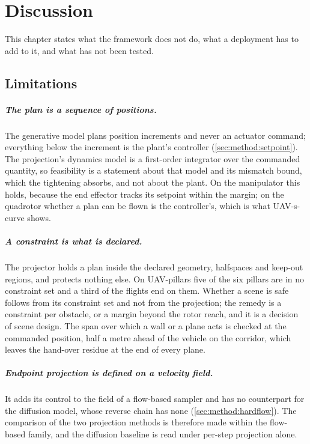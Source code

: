 \chapter{Discussion}\label{ch:discussion}

This chapter states what the framework does not do, what a deployment has to add to it, and what has
not been tested.

\section{Limitations}\label{sec:disc:limitations}

\paragraph{The plan is a sequence of positions.} The generative model plans position increments and
never an actuator command; everything below the increment is the plant's controller
(\autoref{sec:method:setpoint}). The projection's dynamics model is a first-order integrator over the
commanded quantity, so feasibility is a statement about that model and its mismatch bound, which the
tightening absorbs, and not about the plant. On the manipulator this holds, because the end effector
tracks its setpoint within the margin; on the quadrotor whether a plan can be flown is the
controller's, which is what UAV-s-curve shows.

\paragraph{A constraint is what is declared.} The projector holds a plan inside the declared geometry,
halfspaces and keep-out regions, and protects nothing else. On UAV-pillars five of the six pillars are
in no constraint set and a third of the flights end on them. Whether a scene is safe follows from its
constraint set and not from the projection; the remedy is a constraint per obstacle, or a margin beyond
the rotor reach, and it is a decision of scene design. The span over which a wall or a plane acts is
checked at the commanded position, half a metre ahead of the vehicle on the corridor, which leaves the
hand-over residue at the end of every plane.

\paragraph{Endpoint projection is defined on a velocity field.} It adds its control to the field of a
flow-based sampler and has no counterpart for the diffusion model, whose reverse chain has none
(\autoref{sec:method:hardflow}). The comparison of the two projection methods is therefore made within
the flow-based family, and the diffusion baseline is read under per-step projection alone.

